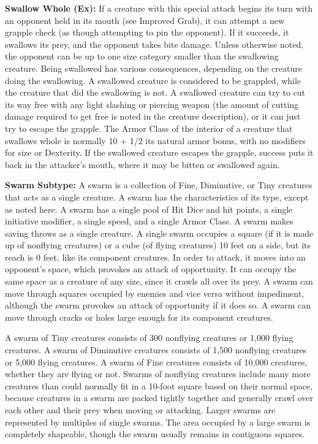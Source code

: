 \documentclass{article}
\begin{document}
\vspace{12pt}
\textbf{Swallow Whole (Ex):} If a creature with this special attack begins its 
turn with an opponent held in its mouth (see Improved Grab), it can attempt a new 
grapple check (as though attempting to pin the opponent). If it succeeds, it swallows 
its prey, and the opponent takes bite damage. Unless otherwise noted, the opponent 
can be up to one size category smaller than the swallowing creature. Being swallowed 
has various consequences, depending on the creature doing the swallowing. A swallowed 
creature is considered to be grappled, while the creature that did the swallowing 
is not. A swallowed creature can try to cut its way free with any light slashing 
or piercing weapon (the amount of cutting damage required to get free is noted 
in the creature description), or it can just try to escape the grapple. The Armor 
Class of the interior of a creature that swallows whole is normally 10 + 1/2 its 
natural armor bonus, with no modifiers for size or Dexterity. If the swallowed 
creature escapes the grapple, success puts it back in the attacker's mouth, where 
it may be bitten or swallowed again.

\vspace{12pt}
\textbf{Swarm Subtype:} A swarm is a collection of Fine, Diminutive, or Tiny creatures 
that acts as a single creature. A swarm has the characteristics of its type, except 
as noted here. A swarm has a single pool of Hit Dice and hit points, a single initiative 
modifier, a single speed, and a single Armor Class. A swarm makes saving throws 
as a single creature. A single swarm occupies a square (if it is made up of nonflying 
creatures) or a cube (of flying creatures) 10 feet on a side, but its reach is 
0 feet, like its component creatures. In order to attack, it moves into an opponent's 
space, which provokes an attack of opportunity. It can occupy the same space as 
a creature of any size, since it crawls all over its prey. A swarm can move through 
squares occupied by enemies and vice versa without impediment, although the swarm 
provokes an attack of opportunity if it does so. A swarm can move through cracks 
or holes large enough for its component creatures.

A swarm of Tiny creatures consists of 300 nonflying creatures or 1,000 flying creatures. 
A swarm of Diminutive creatures consists of 1,500 nonflying creatures or 5,000 
flying creatures. A swarm of Fine creatures consists of 10,000 creatures, whether 
they are flying or not. Swarms of nonflying creatures include many more creatures 
than could normally fit in a 10-foot square based on their normal space, because 
creatures in a swarm are packed tightly together and generally crawl over each 
other and their prey when moving or attacking. Larger swarms are represented by 
multiples of single swarms. The area occupied by a large swarm is completely shapeable, 
though the swarm usually remains in contiguous squares.
\end{document}

